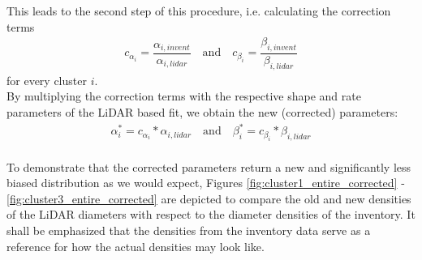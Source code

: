 This leads to the second step of this procedure, i.e. calculating the correction terms
\begin{align*}
 c_{\alpha_i} = \dfrac{\alpha_{i,invent}}{\alpha_{i,lidar}} \quad \text{and} \quad c_{\beta_i} = \dfrac{\beta_{i,invent}}{\beta_{i,lidar}}
\end{align*}
for every cluster $i$.\\

By multiplying the correction terms with the respective shape and rate parameters of the LiDAR based fit, we obtain the new (corrected) parameters:
\begin{align*}
\alpha^*_i = c_{\alpha_i} * \alpha_{i,lidar} \quad \text{and} \quad \beta^*_i = c_{\beta_i} * \beta_{i,lidar}
\end{align*}
\\

To demonstrate that the corrected parameters return a new and significantly less biased distribution as we would expect, Figures \ref{fig:cluster1_entire_corrected} - \ref{fig:cluster3_entire_corrected} are depicted to compare the old and new densities of the LiDAR diameters with respect to the diameter densities of the inventory. It shall be emphasized that the densities from the inventory data serve as a reference for how the actual densities may look like.

